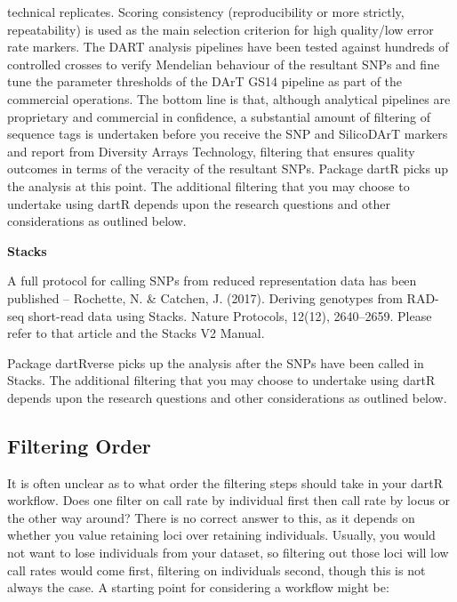 \documentclass[
  letterpaper,
  DIV=11,
  numbers=noendperiod]{scrreprt}
\begin{document}
technical replicates. Scoring consistency (reproducibility or more
strictly, repeatability) is used as the main selection criterion for
high quality/low error rate markers. The DART analysis pipelines have
been tested against hundreds of controlled crosses to verify Mendelian
behaviour of the resultant SNPs and fine tune the parameter thresholds
of the DArT GS14 pipeline as part of the commercial operations. The
bottom line is that, although analytical pipelines are proprietary and
commercial in confidence, a substantial amount of filtering of sequence
tags is undertaken before you receive the SNP and SilicoDArT markers and
report from Diversity Arrays Technology, filtering that ensures quality
outcomes in terms of the veracity of the resultant SNPs. Package dartR
picks up the analysis at this point. The additional filtering that you
may choose to undertake using dartR depends upon the research questions
and other considerations as outlined below.

\textbf{Stacks}

A full protocol for calling SNPs from reduced representation data has
been published -- Rochette, N. \& Catchen, J. (2017). Deriving genotypes
from RAD-seq short-read data using Stacks. Nature Protocols, 12(12),
2640--2659. Please refer to that article and the Stacks V2 Manual.

Package dartRverse picks up the analysis after the SNPs have been called
in Stacks. The additional filtering that you may choose to undertake
using dartR depends upon the research questions and other considerations
as outlined below.

\hypertarget{filtering-order}{%
\subsection*{Filtering Order}\label{filtering-order}}

It is often unclear as to what order the filtering steps should take in
your dartR workflow. Does one filter on call rate by individual first
then call rate by locus or the other way around? There is no correct
answer to this, as it depends on whether you value retaining loci over
retaining individuals. Usually, you would not want to lose individuals
from your dataset, so filtering out those loci will low call rates would
come first, filtering on individuals second, though this is not always
the case. A starting point for considering a workflow might be:
\end{document}
